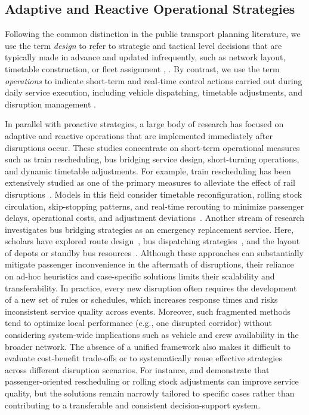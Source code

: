 \documentclass[3p,times,procedia]{elsarticle}
\begin{document}
\subsection{Adaptive and Reactive Operational Strategies}

Following the common distinction in the public transport planning literature, we use the term \textit{design} to refer to strategic and tactical level decisions that are typically made in advance and updated infrequently, such as network layout, timetable construction, or fleet assignment \citep{Desaulnier2007}, \citep[Section~1.5.2]{Cascetta2009}. By contrast, we use the term \textit{operations} to indicate short-term and real-time control actions carried out during daily service execution, including vehicle dispatching, timetable adjustments, and disruption management \citep[Ch.~13]{Gkiotsalitis2022}.

In parallel with proactive strategies, a large body of research has focused on adaptive and reactive operations 
that are implemented immediately after disruptions occur. 
These studies concentrate on short-term operational measures such as train rescheduling, bus bridging service design, 
short-turning operations, and dynamic timetable adjustments. 
For example, train rescheduling has been extensively studied as one of the primary measures to alleviate the effect of rail disruptions~\citep{Cacchiani2014,Xu2017,Veelenturf2016,ZhuGoverde2020}. 
Models in this field consider timetable reconfiguration, rolling stock circulation, skip-stopping patterns, and real-time rerouting 
to minimize passenger delays, operational costs, and adjustment deviations~\citep{Kang2015,Corman2012}. 
Another stream of research investigates bus bridging strategies as an emergency replacement service. 
Here, scholars have explored route design~\citep{Jin2016,vanDerHurk2016,Deng2018}, 
bus dispatching strategies~\citep{Wang2014,Yuan2025}, and the layout of depots or standby bus resources~\citep{Pender2014,Pender2015}. 
Although these approaches can substantially mitigate passenger inconvenience in the aftermath of disruptions, their reliance on ad-hoc heuristics and case-specific solutions limits their scalability and transferability. 
In practice, every new disruption often requires the development of a new set of rules or schedules, which increases response times and risks inconsistent service quality across events. 
Moreover, such fragmented methods tend to optimize local performance (e.g., one disrupted corridor) without considering system-wide implications such as vehicle and crew availability in the broader network. 
The absence of a unified framework also makes it difficult to evaluate cost-benefit trade-offs or to systematically reuse effective strategies across different disruption scenarios. 
For instance, \citet{binder2017multi} and \citet{van2018passenger} 
demonstrate that passenger-oriented rescheduling or rolling stock adjustments can improve service quality, but the solutions remain narrowly tailored to specific cases rather than contributing to a transferable and consistent decision-support system.
\end{document}
